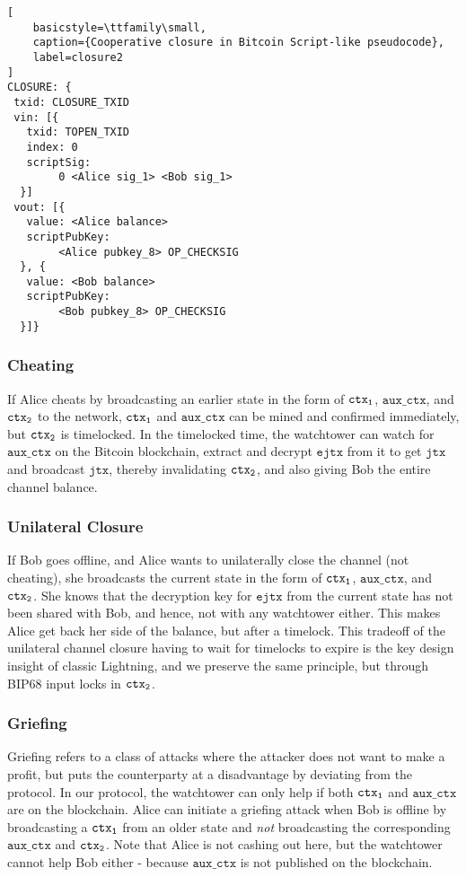\begin{lstlisting}[
    basicstyle=\ttfamily\small,
    caption={Cooperative closure in Bitcoin Script-like pseudocode},
    label=closure2
]
CLOSURE: {
 txid: CLOSURE_TXID
 vin: [{
   txid: TOPEN_TXID
   index: 0
   scriptSig: 
        0 <Alice sig_1> <Bob sig_1>
  }]
 vout: [{
   value: <Alice balance>
   scriptPubKey: 
        <Alice pubkey_8> OP_CHECKSIG
  }, {
   value: <Bob balance>
   scriptPubKey: 
        <Bob pubkey_8> OP_CHECKSIG
  }]}
\end{lstlisting}


\subsubsection{Cheating}
If Alice cheats by broadcasting an earlier state in the form of $\texttt{ctx\textsubscript{1}}$, $\texttt{aux\_ctx}$, and $\texttt{ctx\textsubscript{2}}$ to the network, $\texttt{ctx\textsubscript{1}}$ and $\texttt{aux\_ctx}$ can be mined and confirmed immediately, but $\texttt{ctx\textsubscript{2}}$ is timelocked. In the timelocked time, the watchtower can watch for $\texttt{aux\_ctx}$ on the Bitcoin blockchain, extract and decrypt $\texttt{ejtx}$ from it to get $\texttt{jtx}$ and broadcast $\texttt{jtx}$, thereby invalidating $\texttt{ctx\textsubscript{2}}$, and also giving Bob the entire channel balance.

\subsubsection{Unilateral Closure}
If Bob goes offline, and Alice wants to unilaterally close the channel (not cheating), she broadcasts the current state in the form of $\texttt{ctx\textsubscript{1}}$, $\texttt{aux\_ctx}$, and $\texttt{ctx\textsubscript{2}}$. She knows that the decryption key for $\texttt{ejtx}$ from the current state has not been shared with Bob, and hence, not with any watchtower either. This makes Alice get back her side of the balance, but after a timelock. This tradeoff of the unilateral channel closure having to wait for timelocks to expire is the key design insight of classic Lightning, and we preserve the same principle, but through BIP68 input locks in $\texttt{ctx\textsubscript{2}}$.

\subsubsection{Griefing}
Griefing refers to a class of attacks where the attacker does not want to make a profit, but puts the counterparty at a disadvantage by deviating from the protocol. In our protocol, the watchtower can only help if both $\texttt{ctx\textsubscript{1}}$ and $\texttt{aux\_ctx}$ are on the blockchain. Alice can initiate a griefing attack when Bob is offline by broadcasting a $\texttt{ctx\textsubscript{1}}$ from an older state and \textit{not} broadcasting the corresponding $\texttt{aux\_ctx}$ and $\texttt{ctx\textsubscript{2}}$. Note that Alice is not cashing out here, but the watchtower cannot help Bob either - because $\texttt{aux\_ctx}$ is not published on the blockchain.

